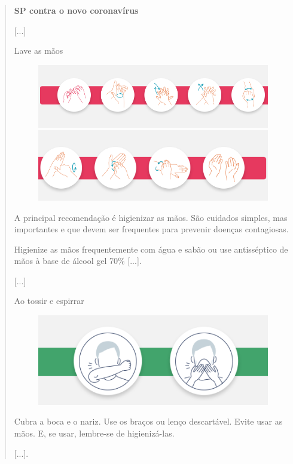 \begin{quote}
\textbf{SP contra o novo coronavírus}

{[}...{]}

Lave as mãos

\begin{figure}[htpb!]
\includegraphics[width=.5\textwidth]{./imgs/img12.png}
\includegraphics[width=.5\textwidth]{./imgs/img13.png}
\end{figure}

A principal recomendação é higienizar as mãos. São cuidados simples,
mas importantes e que devem ser frequentes para prevenir doenças
contagiosas.

Higienize as mãos frequentemente com água e sabão ou use antisséptico de
mãos à base de álcool gel 70\% {[}...{]}.

{[}...{]}

Ao tossir e espirrar

\begin{figure}[htpb!]
\includegraphics[width=.5\textwidth]{./imgs/img14.png}
\end{figure}

Cubra a boca e o nariz. Use os braços ou lenço descartável. Evite usar
as mãos. E, se usar, lembre-se de higienizá-las.

{[}...{]}.

\end{quote}

